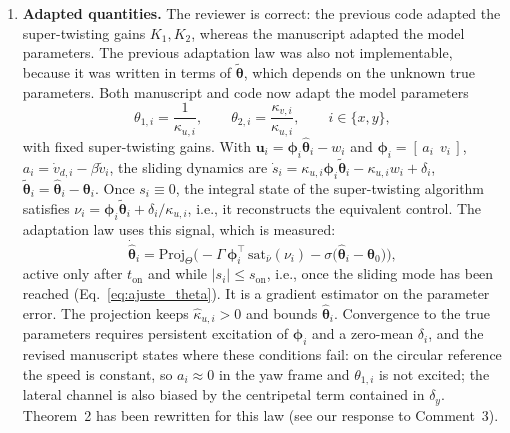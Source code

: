 \begin{reply}
\begin{enumerate}
\item \textbf{Adapted quantities.} The reviewer is correct: the previous code adapted the super-twisting gains $K_1,K_2$, whereas the manuscript adapted the model parameters. The previous adaptation law was also not implementable, because it was written in terms of $\tilde{\boldsymbol{\theta}}$, which depends on the unknown true parameters. Both manuscript and code now adapt the model parameters
\begin{equation*}
\theta_{1,i}=\frac{1}{\kappa_{u,i}},\qquad \theta_{2,i}=\frac{\kappa_{v,i}}{\kappa_{u,i}},\qquad i\in\{x,y\},
\end{equation*}
with fixed super-twisting gains. With $\mathbf{u}_i=\boldsymbol{\phi}_i\hat{\boldsymbol{\theta}}_i-w_i$ and $\boldsymbol{\phi}_i=[\,a_i\ \ v_i\,]$, $a_i=\dot v_{d,i}-\beta\tilde v_i$, the sliding dynamics are $\dot s_i=\kappa_{u,i}\boldsymbol{\phi}_i\tilde{\boldsymbol{\theta}}_i-\kappa_{u,i}w_i+\delta_i$, $\tilde{\boldsymbol{\theta}}_i=\hat{\boldsymbol{\theta}}_i-\boldsymbol{\theta}_i$. Once $s_i\equiv0$, the integral state of the super-twisting algorithm satisfies $\nu_i=\boldsymbol{\phi}_i\tilde{\boldsymbol{\theta}}_i+\delta_i/\kappa_{u,i}$, i.e., it reconstructs the equivalent control. The adaptation law uses this signal, which is measured:
\begin{equation*}
\dot{\hat{\boldsymbol{\theta}}}_i=\mathrm{Proj}_{\Theta}\Big(-\Gamma\,\boldsymbol{\phi}_i^{\top}\,\mathrm{sat}_{\bar\nu}(\nu_i)-\sigma\big(\hat{\boldsymbol{\theta}}_i-\boldsymbol{\theta}_{0}\big)\Big),
\end{equation*}
active only after $t_{\mathrm{on}}$ and while $|s_i|\le s_{\mathrm{on}}$, i.e., once the sliding mode has been reached (Eq.~\eqref{eq:ajuste_theta}). It is a gradient estimator on the parameter error. The projection keeps $\hat{\kappa}_{u,i}>0$ and bounds $\hat{\boldsymbol{\theta}}_i$. Convergence to the true parameters requires persistent excitation of $\boldsymbol{\phi}_i$ and a zero-mean $\delta_i$, and the revised manuscript states where these conditions fail: on the circular reference the speed is constant, so $a_i\approx0$ in the yaw frame and $\theta_{1,i}$ is not excited; the lateral channel is also biased by the centripetal term contained in $\delta_y$.
Theorem~2 has been rewritten for this law (see our response to Comment~3).


\end{enumerate}
\end{reply}
